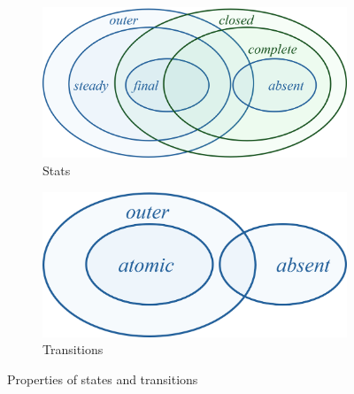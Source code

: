 \documentclass{article}
\begin{document}
\begin{figure}
\centering
\begin{subfigure}{0.45\textwidth}
\centering
\includegraphics[scale=.4]{figs/s-venn}
\caption{Stats}
\end{subfigure}%
\begin{subfigure}{0.3\textwidth}
\centering
\includegraphics[scale=.4]{figs/t-venn}

\bigskip
\caption{Transitions}
\end{subfigure}%
%
\begin{subfigure}{.25\textwidth}

\bigskip
{}
\end{subfigure}
\caption{Properties of states and transitions}
\label{fig:venn}
\end{figure}
\end{document}
